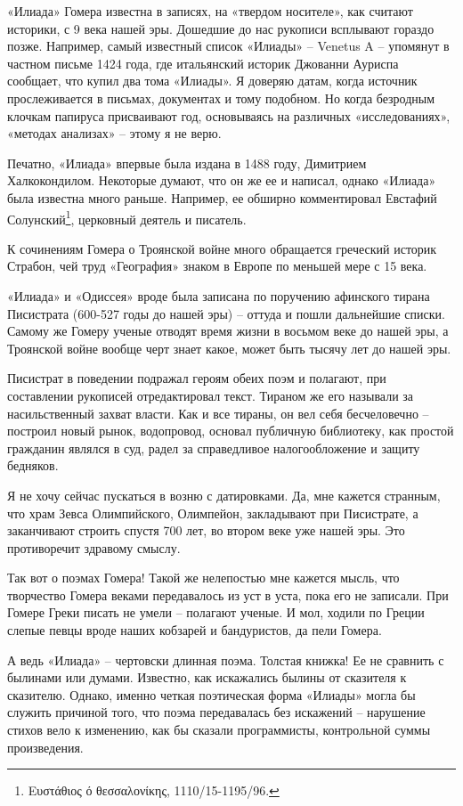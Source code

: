 «Илиада» Гомера известна в записях, на «твердом носителе», как считают историки, с 9 века нашей эры. Дошедшие до нас рукописи всплывают гораздо позже. Например, самый известный список «Илиады» – Venetus A – упомянут в частном письме 1424 года, где итальянский историк Джованни Ауриспа сообщает, что купил два тома «Илиады». Я доверяю датам, когда источник прослеживается в письмах, документах и тому подобном. Но когда безродным клочкам папируса присваивают год, основываясь на различных «исследованиях», «методах анализах» – этому я не верю. 

Печатно, «Илиада» впервые была издана в 1488 году, Димитрием Халкокондилом. Некоторые думают, что он же ее и написал, однако «Илиада» была известна много раньше. Например, ее обширно комментировал Евстафий Солунский\footnote{Ευστάθιος ό θεσσαλονίκης, 1110/15-1195/96.}, церковный деятель и писатель. 

К сочинениям Гомера о Троянской войне много обращается греческий историк Страбон, чей труд «География» знаком в Европе по меньшей мере с 15 века.

«Илиада» и «Одиссея» вроде была записана по поручению афинского тирана Писистрата (600-527 годы до нашей эры) – оттуда и пошли дальнейшие списки. Самому же Гомеру ученые отводят время жизни в восьмом веке до нашей эры, а Троянской войне вообще черт знает какое, может быть тысячу лет до нашей эры.

Писистрат в поведении подражал героям обеих поэм и полагают, при составлении рукописей отредактировал текст. Тираном же его называли за насильственный захват власти. Как и все тираны, он вел себя бесчеловечно – построил новый рынок, водопровод, основал публичную библиотеку, как простой гражданин являлся в суд, радел за справедливое налогообложение и защиту бедняков.

Я не хочу сейчас пускаться в возню с датировками. Да, мне кажется странным, что храм Зевса Олимпийского, Олимпейон, закладывают при Писистрате, а заканчивают строить спустя 700 лет, во втором веке уже нашей эры. Это противоречит здравому смыслу.

Так вот о поэмах Гомера! Такой же нелепостью мне кажется мысль, что творчество Гомера веками передавалось из уст в уста, пока его не записали. При Гомере Греки писать не умели – полагают ученые. И мол, ходили по Греции слепые певцы вроде наших кобзарей и бандуристов, да пели Гомера. 

А ведь «Илиада» – чертовски длинная поэма. Толстая книжка! Ее не сравнить с былинами или думами. Известно, как искажались былины от сказителя к сказителю. Однако, именно четкая поэтическая форма «Илиады» могла бы служить причиной того, что поэма передавалась без искажений – нарушение стихов вело к изменению, как бы сказали программисты, контрольной суммы произведения.

